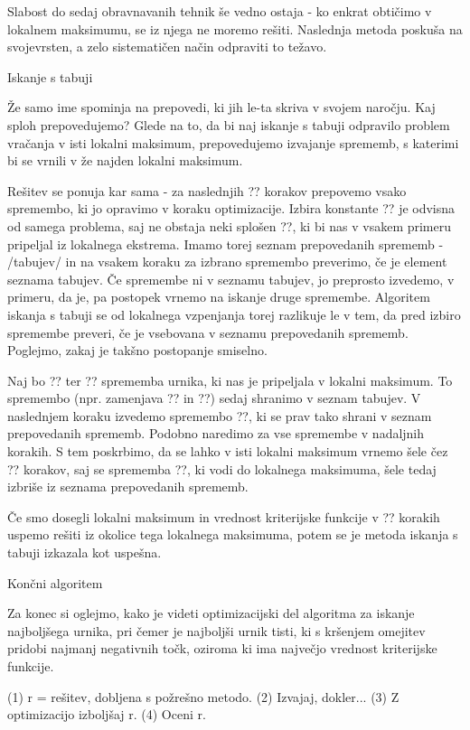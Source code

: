 \documentclass[a4paper,10pt]{article}
\begin{document}
Slabost do sedaj obravnavanih tehnik še vedno ostaja - ko enkrat obtičimo v lokalnem
maksimumu, se iz njega ne moremo rešiti. Naslednja metoda poskuša na svojevrsten, a zelo
sistematičen način odpraviti to težavo.

Iskanje s tabuji %

Že samo ime spominja na prepovedi, ki jih le-ta skriva v svojem naročju. Kaj sploh prepovedujemo?
Glede na to, da bi naj iskanje s tabuji odpravilo problem vračanja v isti lokalni maksimum,
prepovedujemo izvajanje sprememb, s katerimi bi se vrnili v že najden lokalni maksimum.

Rešitev se ponuja kar sama - za naslednjih ?? korakov prepovemo vsako spremembo, ki jo
opravimo v koraku optimizacije. Izbira konstante ?? je odvisna od samega problema, saj
ne obstaja neki splošen ??, ki bi nas v vsakem primeru pripeljal iz lokalnega ekstrema.
Imamo torej seznam prepovedanih sprememb - /tabujev/ in na vsakem koraku za izbrano
spremembo preverimo, če je element seznama tabujev. Če spremembe ni v seznamu tabujev, jo
preprosto izvedemo, v primeru, da je, pa postopek vrnemo na iskanje druge spremembe.
Algoritem iskanja s tabuji se od lokalnega vzpenjanja torej razlikuje le v tem, da pred
izbiro spremembe preveri, če je vsebovana v seznamu prepovedanih sprememb. Poglejmo, zakaj
je takšno postopanje smiselno.

Naj bo ?? ter ?? sprememba urnika, ki nas je pripeljala v lokalni maksimum. To
spremembo (npr. zamenjava ?? in ??) sedaj shranimo v
seznam tabujev. V naslednjem koraku izvedemo spremembo ??, ki se prav tako shrani v
seznam prepovedanih sprememb. Podobno naredimo za vse spremembe v nadaljnih korakih. S
tem poskrbimo, da se lahko v isti lokalni maksimum vrnemo šele čez ?? korakov, saj
se sprememba ??, ki vodi do lokalnega maksimuma, šele tedaj izbriše iz seznama
prepovedanih sprememb.

Če smo dosegli lokalni maksimum in vrednost kriterijske funkcije v ?? korakih uspemo
rešiti iz okolice tega lokalnega maksimuma, potem se je metoda iskanja s tabuji izkazala
kot uspešna.

Končni algoritem %

Za konec si oglejmo, kako je videti optimizacijski del algoritma za iskanje najboljšega
urnika, pri čemer je najboljši urnik tisti, ki s kršenjem omejitev pridobi najmanj negativnih
točk, oziroma ki ima največjo vrednost kriterijske funkcije.

(1) r = rešitev, dobljena s požrešno metodo.
(2) Izvajaj, dokler...
{
   (3) Z optimizacijo izboljšaj r.
   (4) Oceni r.
}
\end{document}
